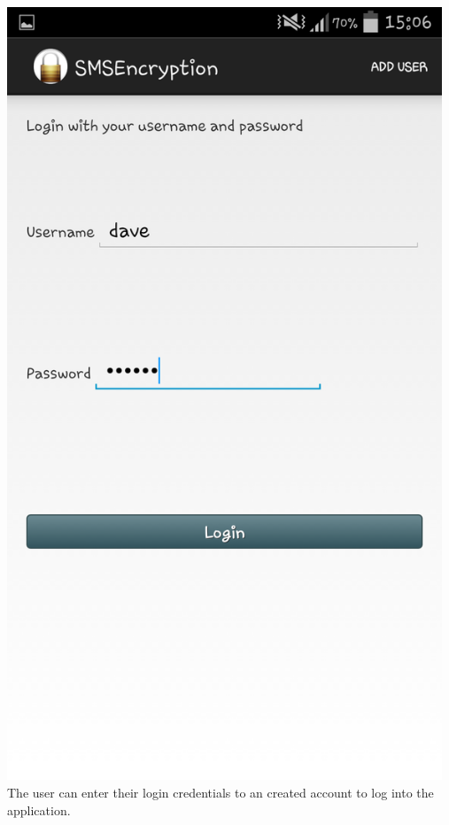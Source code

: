 \begin{center}
 \includegraphics[width=13cm]{screenshots/normal/2_LoginScreenFilledIn.png}
The user can enter their login credentials to an created account to log into the application.
\end{center}
